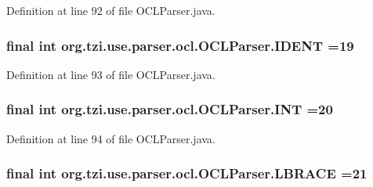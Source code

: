 Definition at line 92 of file O\-C\-L\-Parser.\-java.

\hypertarget{classorg_1_1tzi_1_1use_1_1parser_1_1ocl_1_1_o_c_l_parser_a2e715b8d072b03c49cf63d9af35d977a}{
\subsubsection[{I\-D\-E\-N\-T}]{\setlength{\rightskip}{0pt plus 5cm}final int org.\-tzi.\-use.\-parser.\-ocl.\-O\-C\-L\-Parser.\-I\-D\-E\-N\-T =19\hspace{0.3cm}{\ttfamily [static]}}}\label{classorg_1_1tzi_1_1use_1_1parser_1_1ocl_1_1_o_c_l_parser_a2e715b8d072b03c49cf63d9af35d977a}


Definition at line 93 of file O\-C\-L\-Parser.\-java.

\hypertarget{classorg_1_1tzi_1_1use_1_1parser_1_1ocl_1_1_o_c_l_parser_ac06d866219fc14bef1e7365ff94bc7f7}{
\subsubsection[{I\-N\-T}]{\setlength{\rightskip}{0pt plus 5cm}final int org.\-tzi.\-use.\-parser.\-ocl.\-O\-C\-L\-Parser.\-I\-N\-T =20\hspace{0.3cm}{\ttfamily [static]}}}\label{classorg_1_1tzi_1_1use_1_1parser_1_1ocl_1_1_o_c_l_parser_ac06d866219fc14bef1e7365ff94bc7f7}


Definition at line 94 of file O\-C\-L\-Parser.\-java.

\hypertarget{classorg_1_1tzi_1_1use_1_1parser_1_1ocl_1_1_o_c_l_parser_a9ce09a6f294ef55c6715f082f2c823a0}{
\subsubsection[{L\-B\-R\-A\-C\-E}]{\setlength{\rightskip}{0pt plus 5cm}final int org.\-tzi.\-use.\-parser.\-ocl.\-O\-C\-L\-Parser.\-L\-B\-R\-A\-C\-E =21\hspace{0.3cm}{\ttfamily [static]}}}\label{classorg_1_1tzi_1_1use_1_1parser_1_1ocl_1_1_o_c_l_parser_a9ce09a6f294ef55c6715f082f2c823a0}



